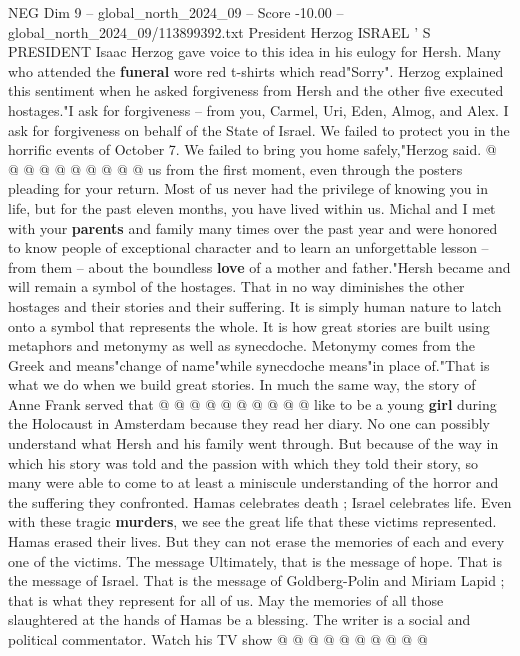 \begin{textsample}{NEG Dim 9 – global\_north\_2024\_09 – Score -10.00 – global\_north\_2024\_09/113899392.txt}
President Herzog ISRAEL ' S PRESIDENT Isaac Herzog gave voice to this idea in his eulogy for Hersh.
Many who attended the \textbf{funeral} wore red t-shirts which read"Sorry".
Herzog explained this sentiment when he asked forgiveness from Hersh and the other five executed hostages."I ask for forgiveness -- from you, Carmel, Uri, Eden, Almog, and Alex.
I ask for forgiveness on behalf of the State of Israel.
We failed to protect you in the horrific events of October 7.
We failed to bring you home safely,"Herzog said. @ @ @ @ @ @ @ @ @ @ us from the first moment, even through the posters pleading for your return.
Most of us never had the privilege of knowing you in life, but for the past eleven months, you have lived within us.
Michal and I met with your \textbf{parents} and family many times over the past year and were honored to know people of exceptional character and to learn an unforgettable lesson -- from them -- about the boundless \textbf{love} of a mother and father."Hersh became and will remain a symbol of the hostages.
That in no way diminishes the other hostages and their stories and their suffering.
It is simply human nature to latch onto a symbol that represents the whole.
It is how great stories are built using metaphors and metonymy as well as synecdoche.
Metonymy comes from the Greek and means"change of name"while synecdoche means"in place of."That is what we do when we build great stories.
In much the same way, the story of Anne Frank served that @ @ @ @ @ @ @ @ @ @ like to be a young \textbf{girl} during the Holocaust in Amsterdam because they read her diary.
No one can possibly understand what Hersh and his family went through.
But because of the way in which his story was told and the passion with which they told their story, so many were able to come to at least a miniscule understanding of the horror and the suffering they confronted.
Hamas celebrates death ; Israel celebrates life.
Even with these tragic \textbf{murders}, we see the great life that these victims represented.
Hamas erased their lives.
But they can not erase the memories of each and every one of the victims.
The message Ultimately, that is the message of hope.
That is the message of Israel.
That is the message of Goldberg-Polin and Miriam Lapid ; that is what they represent for all of us.
May the memories of all those slaughtered at the hands of Hamas be a blessing.
The writer is a social and political commentator.
Watch his TV show @ @ @ @ @ @ @ @ @ @

\end{textsample}
